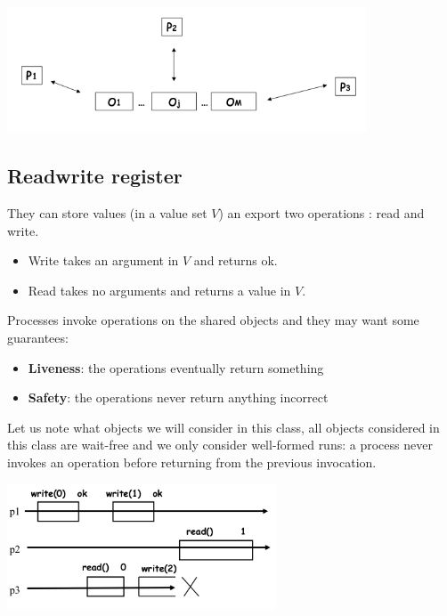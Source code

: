 \documentclass{article}
\theoremstyle{definition}
\begin{document}
\begin{center}
\includegraphics[width=0.8\textwidth]{sharedmemmodel}
\end{center}

\subsection{Readwrite register}

They can store values (in a value set $V$) an export two operations : read and write.
\begin{itemize}
	\item Write takes an argument in $V$ and returns ok.
	\item Read takes no arguments and returns a value in $V$.
\end{itemize}

Processes invoke operations on the shared objects and they may want some guarantees:
\begin{itemize}
	\item \textbf{Liveness}: the operations eventually return something
	\item \textbf{Safety}: the operations never return anything incorrect
\end{itemize}

Let us note what objects we will consider in this class, all objects considered in this class are wait-free and we only consider well-formed runs: a process never invokes an operation before returning from the previous invocation.

\begin{center}
\includegraphics[width=0.6\textwidth]{well_formed}
\end{center}
\end{document}
